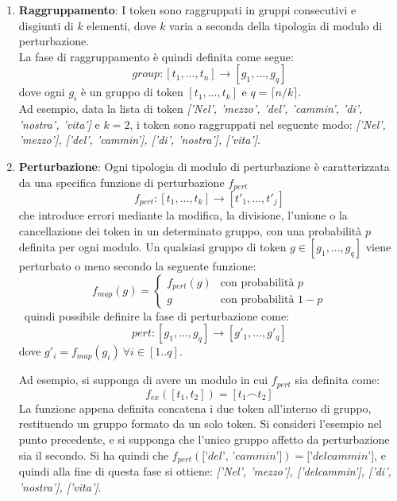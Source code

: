 \begin{enumerate}
	\item \textbf{Raggruppamento}: I token sono raggruppati in gruppi consecutivi e disgiunti di $k$ elementi, dove $k$ varia a seconda della tipologia di modulo di perturbazione. \\
La fase di raggruppamento è quindi definita come segue:
\begin{equation}
group: [t_1,...,t_n] \rightarrow [g_1,...,g_q]
\end{equation}
dove ogni $g_i$ è un gruppo di token $[t_1,..., t_k  ]$ e $q = \lceil n/k \rceil$.\\
	
Ad esempio, data la lista di token \textit{['Nel', 'mezzo', 'del', 'cammin', 'di', 'nostra', 'vita']} e $k = 2$, i token sono raggruppati nel seguente modo: \textit{['Nel', 'mezzo'], ['del', 'cammin'], ['di', 'nostra'], ['vita']}.
	
	\item \textbf{Perturbazione}: Ogni tipologia di modulo di perturbazione è caratterizzata da una specifica funzione di perturbazione $f_{pert}$
\begin{equation}
f_{pert}: [t_1,..., t_k  ] \rightarrow [t'_1,..., t'_j]
\end{equation}
che introduce errori mediante la modifica, la divisione, l'unione o la cancellazione dei token in un determinato gruppo, con una probabilità $p$ definita per ogni modulo. Un qualsiasi gruppo di token $g \in [g_1,...,g_q]$ viene perturbato o meno secondo la seguente funzione:
\begin{equation}
f_{map}(g) =
    \begin{cases}
      f_{pert}(g) & \text{con probabilità $p$}\\
      g & \text{con probabilità $1-p$}
    \end{cases}  
\end{equation}
\E\ quindi possibile definire la fase di perturbazione come:
\begin{equation}
pert: [g_1,...,g_q] \rightarrow [g\prime_1,...,g\prime_q]
\end{equation}
dove $g\prime_i = f_{map}(g_i)\ \forall i \in [1..q]$.


Ad esempio, si supponga di avere un modulo in cui $f_{pert}$ sia definita come:
\begin{equation}
f_{ex}([t_1,t_2]) = [t_1 \frown t_2]
\end{equation}
La funzione appena definita concatena i due token all'interno di gruppo, restituendo un gruppo formato da un solo token. Si consideri l'esempio nel punto precedente, e si supponga che l'unico gruppo affetto da perturbazione sia il secondo. Si ha quindi che $f_{pert}(\textit{['del', 'cammin']}) = \textit{['delcammin']}$, e quindi alla fine di questa fase si ottiene: \textit{['Nel', 'mezzo'], ['delcammin'], ['di', 'nostra'], ['vita']}.


\end{enumerate}

